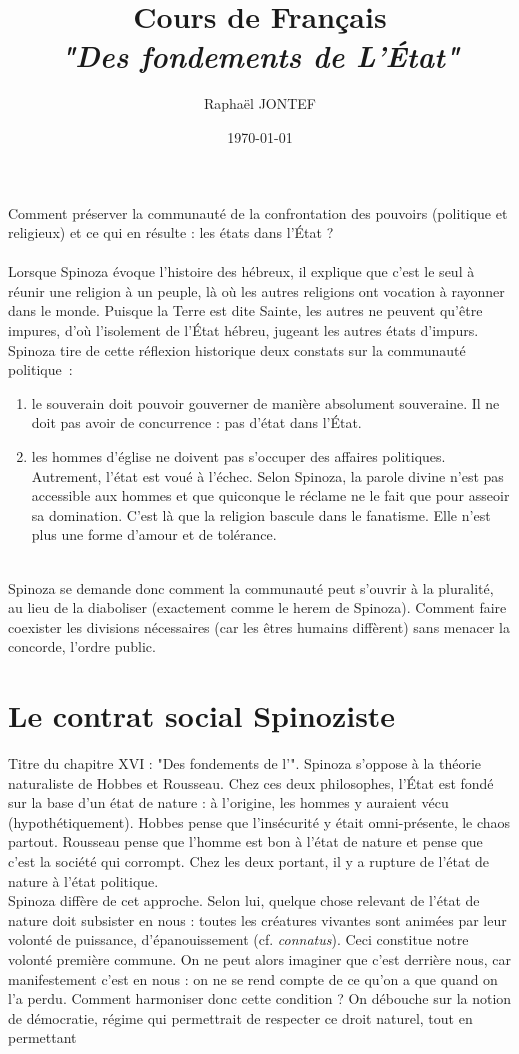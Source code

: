 \documentclass[a4paper,12pt]{article}
\title{Cours de Français\\ \Large \textit{"Des fondements de L'État"}}
\author{Raphaël JONTEF}
\date{\today}
\begin{document}
\maketitle
Comment préserver la communauté de la confrontation des pouvoirs (politique et religieux) et ce qui en résulte : les états dans l'État ?\\\\

Lorsque Spinoza évoque l'histoire des hébreux, il explique que c'est le seul à réunir une religion à un peuple, là où les autres religions ont vocation à rayonner dans le monde. Puisque la Terre est dite Sainte, les autres ne peuvent qu'être impures, d'où l'isolement de l'État hébreu, jugeant les autres états d'impurs. Spinoza tire de cette réflexion historique deux constats sur la communauté politique~:
\begin{enumerate}
    \item le souverain doit pouvoir gouverner de manière absolument souveraine. Il ne doit pas avoir de concurrence : pas d'état dans l'État.
    \item les hommes d'église ne doivent pas s'occuper des affaires politiques. Autrement, l'état est voué à l'échec. Selon Spinoza, la parole divine n'est pas accessible aux hommes et que quiconque le réclame ne le fait que pour asseoir sa domination. C'est là que la religion bascule dans le fanatisme. Elle n'est plus une forme d'amour et de tolérance.
\end{enumerate}
\\
Spinoza se demande donc comment la communauté peut s'ouvrir à la pluralité, au lieu de la diaboliser (exactement comme le herem de Spinoza). Comment faire coexister les divisions nécessaires (car les êtres humains diffèrent) sans menacer la concorde, l'ordre public.

\section{Le contrat social Spinoziste}

Titre du chapitre XVI : "Des fondements de l'". Spinoza s'oppose à la théorie naturaliste de Hobbes et Rousseau. Chez ces deux philosophes, l'État est fondé sur la base d'un état de nature : à l'origine, les hommes y auraient vécu (hypothétiquement). Hobbes pense que l'insécurité y était omni-présente, le chaos partout. Rousseau pense que l'homme est bon à l'état de nature et pense que c'est la société qui corrompt. Chez les deux portant, il y a rupture de l'état de nature à l'état politique. \\
Spinoza diffère de cet approche. Selon lui, quelque chose relevant de l'état de nature doit subsister en nous : toutes les créatures vivantes sont animées par leur volonté de puissance, d'épanouissement (cf. \textit{connatus}). Ceci constitue notre volonté première commune. On ne peut alors imaginer que c'est derrière nous, car manifestement c'est en nous : on ne se rend compte de ce qu'on a que quand on l'a perdu. Comment harmoniser donc cette condition ? On débouche sur la notion de démocratie, régime qui permettrait de respecter ce droit naturel, tout en permettant 
\end{document}
